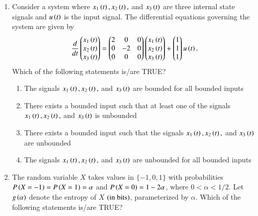 \documentclass[journal,12pt,onecolumn]{IEEEtran}
\theoremstyle{remark}
\begin{document}
\begin{enumerate}
\item Consider a system where $x_1\left(t\right), x_2\left(t\right),$ and $x_3\left(t\right)$ are three internal state signals and $u\left(t\right)$ is the input signal. The differential equations governing the system are given by
\begin{align*}
 \frac{d}{dt} \begin{pmatrix}x_1\left(t\right) \\ x_2\left(t\right) \\ x_3\left(t\right)\end{pmatrix} = \begin{pmatrix}2 & 0 & 0 \\ 0 & -2 & 0 \\ 0 & 0 & 0\end{pmatrix} \begin{pmatrix}x_1\left(t\right) \\ x_2\left(t\right) \\ x_3\left(t\right)\end{pmatrix} + \begin{pmatrix}1 \\ 1 \\ 1\end{pmatrix} u\left(t\right).   
\end{align*} 
Which of the following statements is/are TRUE?

\hfill{}

\begin{enumerate}
\item The signals $x_1\left(t\right), x_2\left(t\right),$ and $x_3\left(t\right)$ are bounded for all bounded inputs
\item There exists a bounded input such that at least one of the signals $x_1\left(t\right), x_2\left(t\right),$ and $x_3\left(t\right)$ is unbounded
\item There exists a bounded input such that the signals $x_1\left(t\right), x_2\left(t\right),$ and $x_3\left(t\right)$ are unbounded
\item The signals $x_1\left(t\right), x_2\left(t\right),$ and $x_3\left(t\right)$ are unbounded for all bounded inputs
\end{enumerate}

\item The random variable $X$ takes values in $\{-1,0,1\}$ with probabilities $P\left(X = -1\right) = P\left(X = 1\right) = \alpha$ and $P\left(X = 0\right) = 1 - 2\alpha$, where $0 < \alpha < 1/2$. Let $g\left(\alpha\right)$ denote the entropy of $X$ $\left(\text{in bits}\right)$, parameterized by $\alpha$. Which of the following statements is/are TRUE?

\hfill{}

\begin{enumerate}
\end{enumerate}


\end{enumerate}
\end{document}
